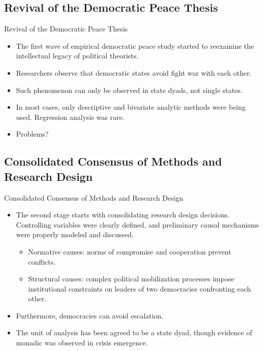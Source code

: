 \documentclass{beamer}
\begin{document}
	\subsection{Revival of the Democratic Peace Thesis}
	
	\begin{frame}{Revival of the Democratic Peace Thesis}
		\begin{itemize}
			\item The first wave of empirical democratic peace study started to reexamine the intellectual legacy of political theorists. \autocite{doyleLiberalismWorldPolitics1986}
			\item Researchers observe that democratic states avoid fight war with each other. \autocite{chanMirrorMirrorWall1984}
			\item Such phenomenon can only be observed in state dyads, not single states. \autocite{maozRegimeTypesInternational1989}
			\item In most cases, only descriptive and bivariate analytic methods were being used. Regression analysis was rare. \autocite{rummelLibertarianismInternationalViolence1983}
			\item Problems?
		\end{itemize}
	\end{frame}
	
	\subsection{Consolidated Consensus of Methods and Research Design}
	
	\begin{frame}{Consolidated Consensus of Methods and Research Design}
		\begin{itemize}
			\item The second stage starts with consolidating research design decisions. Controlling variables were clearly defined, and preliminary causal mechanisms were properly modeled and discussed. \autocite{maozNormativeStructuralCauses1993}
			\begin{itemize}
				\item Normative causes: norms of compromise and cooperation prevent conflicts.
				\item Structural causes: complex political mobilization processes impose institutional constraints on leaders of two democracies confronting each other.
			\end{itemize}
			\item Furthermore, democracies can avoid escalation. \autocite{dixonDemocracyPeacefulSettlement1994}
			\item The unit of analysis has been agreed to be a state dyad, though evidence of monadic was observed in crisis emergence. \autocite{rousseauAssessingDyadicNature1996}
		\end{itemize}
	\end{frame}
\end{document}
